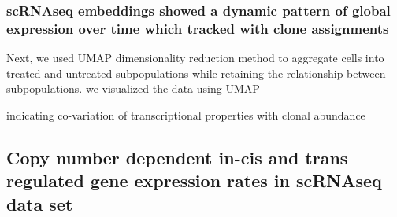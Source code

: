 \subsubsection{scRNAseq embeddings showed a dynamic pattern of global expression over time which tracked with clone assignments}
Next, we used UMAP \cite{becht2019dimensionality} dimensionality reduction method to aggregate cells into treated and untreated subpopulations while retaining the relationship between subpopulations. 
we visualized the data using UMAP

indicating co-variation of transcriptional properties with clonal abundance


\subsection{Copy number dependent in-cis and trans regulated gene expression rates in scRNAseq data set}



